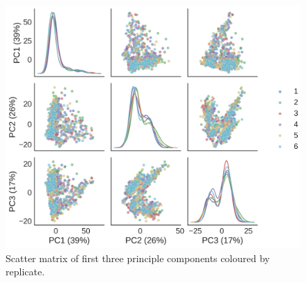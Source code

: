 \documentclass[alpha-refs]{wiley-article}
\begin{document}
\begin{figure}
	\centering
	\includegraphics[height=0.5\textheight]{img/qc/replicate}
	\caption{Scatter matrix of first three principle components coloured by replicate.}
	\label{fig:qc:replicate}
\end{figure}
\end{document}
